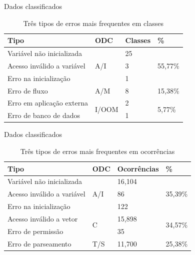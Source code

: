 \documentclass[brazilian]{beamer}
\begin{document}
\begin{frame}{Dados classificados}
    \begin{table}[H]
        \centering
        \begin{tabularx}{\linewidth}{ l|l|l|l }
            \textbf{Tipo} & \textbf{ODC} & \textbf{Classes} & \textbf{\%} \\
            \hline
            Variável não inicializada & \multirow{3}{*}{ A/I } & 25 & \multirow{3}{*}{ 55,77\% } \\
            Acesso inválido a variável & & 3 & \\
            Erro na inicialização & & 1 & \\
            \hline
            Erro de fluxo & A/M & 8 & 15,38\% \\
            \hline
            Erro em aplicação externa & \multirow{2}{*}{I/OOM} & 2 & \multirow{2}{*}{5,77\%} \\
            Erro de banco de dados & & 1 \\
        \end{tabularx}
        \caption{Três tipos de erros mais frequentes em classes}
        \label{table:our_results_classified_by_odc}
    \end{table}
\end{frame}

\begin{frame}{Dados classificados}
    \begin{table}[H]
        \centering
        \begin{tabularx}{\linewidth}{ l|l|l|l }
            \textbf{Tipo} & \textbf{ODC} & \textbf{Ocorrências} & \textbf{\%} \\
            \hline
            Variável não inicializada & \multirow{3}{*}{ A/I } & 16,104 & \multirow{3}{*}{ 35,39\% } \\
            Acesso inválido a variável & & 86 & \\
            Erro na inicialização & & 122 & \\
            \hline
            Acesso inválido a vetor & \multirow{2}{*}{C} & 15,898 & \multirow{2}{*}{34,57\%} \\
            Erro de permissão & & 35 & \\
            \hline
            Erro de parseamento & T/S & 11,700 & 25,38\% \\
        \end{tabularx}
        \caption{Três tipos de erros mais frequentes em ocorrências}
        \label{table:our_results_classified_by_odc_2}
    \end{table}
\end{frame}
\end{document}
